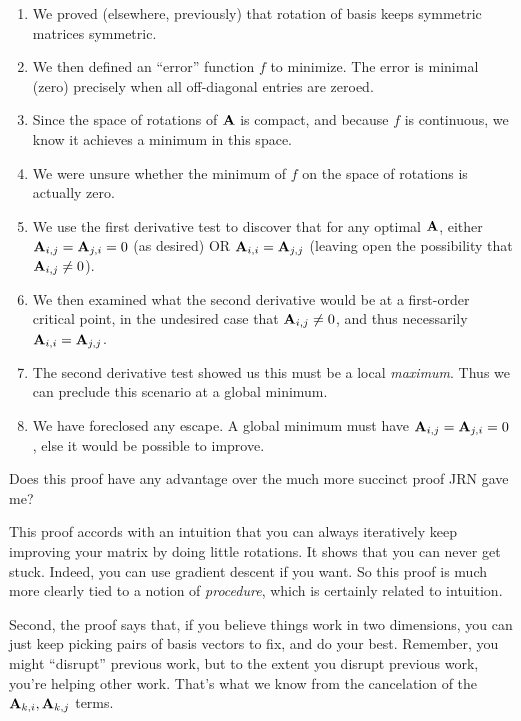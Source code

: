 \documentclass[11pt, oneside]{amsart}
\begin{document}
\begin{enumerate}
  \item We proved (elsewhere, previously) that rotation of basis keeps
  symmetric matrices symmetric.

  \item We then defined an ``error'' function $f$ to minimize. The error
  is minimal (zero) precisely when all off-diagonal entries are zeroed.

  \item Since the space of rotations of $\mathbf{A}$ is compact, and because
  $f$ is continuous, we know it achieves a minimum in this space.

  \item We were unsure whether the minimum of $f$ on the space of
  rotations is actually zero.

  \item We use the first derivative test to discover that for any
  optimal $\mathbf{A}$, either $\mathbf{A}_{i, j} = \mathbf{A}_{j, i} = 0$ (as desired)
  OR $\mathbf{A}_{i, i} = \mathbf{A}_{j, j}$ (leaving open the possibility that
  $\mathbf{A}_{i, j} \ne 0$).

  \item We then examined what the second derivative would be at a
  first-order critical point, in the undesired case that $\mathbf{A}_{i, j}
  \ne 0$, and thus necessarily $\mathbf{A}_{i, i} = \mathbf{A}_{j, j}$.

  \item The second derivative test showed us this must be a local
  \textit{maximum}. Thus we can preclude this scenario at a global
  minimum.

  \item We have foreclosed any escape. A global minimum must have
  $\mathbf{A}_{i, j} = \mathbf{A}_{j, i} = 0$, else it would be possible to
  improve.
\end{enumerate}

Does this proof have any advantage over the much more succinct proof JRN
gave me?

This proof accords with an intuition that you can always iteratively
keep improving your matrix by doing little rotations. It shows that you
can never get stuck. Indeed, you can use gradient descent if you want.
So this proof is much more clearly tied to a notion of
\textit{procedure}, which is certainly related to intuition.

Second, the proof says that, if you believe things work in two
dimensions, you can just keep picking pairs of basis vectors to fix, and
do your best. Remember, you might ``disrupt'' previous work, but to the
extent you disrupt previous work, you're helping other work. That's what
we know from the cancelation of the $\mathbf{A}_{k, i}, \mathbf{A}_{k, j}$ terms.
\end{document}
